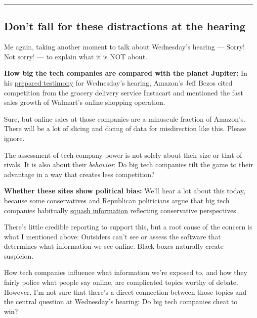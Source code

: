 \begin{center}\rule{0.5\linewidth}{\linethickness}\end{center}

\hypertarget{dont-fall-for-these-distractions-at-the-hearing}{%
\subsection{Don't fall for these distractions at the
hearing}\label{dont-fall-for-these-distractions-at-the-hearing}}

Me again, taking another moment to talk about Wednesday's hearing ---
Sorry! Not sorry! --- to explain what it is NOT about.

\textbf{How big the tech companies are compared with the planet
Jupiter:} In his
\href{https://docs.house.gov/meetings/JU/JU05/20200729/110883/HHRG-116-JU05-Wstate-BezosJ-20200729.pdf}{prepared
testimony} for Wednesday's hearing, Amazon's Jeff Bezos cited
competition from the grocery delivery service Instacart and mentioned
the fast sales growth of Walmart's online shopping operation.

Sure, but online sales at those companies are a minuscule fraction of
Amazon's. There will be a lot of slicing and dicing of data for
misdirection like this. Please ignore.

The assessment of tech company power is not solely about their size or
that of rivals. It is also about their \emph{behavior}: Do big tech
companies tilt the game to their advantage in a way that creates less
competition?

\textbf{Whether these sites show political bias:} We'll hear a lot about
this today, because some conservatives and Republican politicians argue
that big tech companies habitually
\href{https://www.nytimes.com/2019/05/15/us/donald-trump-twitter-facebook-youtube.html}{squash
information} reflecting conservative perspectives.

There's little credible reporting to support this, but a root cause of
the concern is what I mentioned above: Outsiders can't see or assess the
software that determines what information we see online. Black boxes
naturally create suspicion.

How tech companies influence what information we're exposed to, and how
they fairly police what people say online, are complicated topics worthy
of debate. However, I'm not sure that there's a direct connection
between those topics and the central question at Wednesday's hearing: Do
big tech companies cheat to win?

